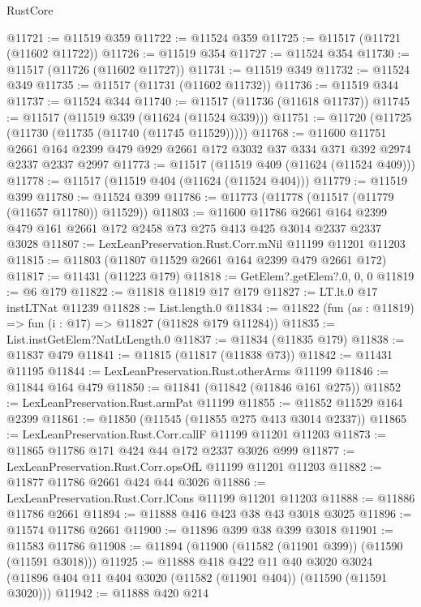 \begin{lexlean}{RustCore}
\begin{coremodule}
@11721 := @11519 @359
@11722 := @11524 @359
@11725 := @11517 (@11721 (@11602 @11722))
@11726 := @11519 @354
@11727 := @11524 @354
@11730 := @11517 (@11726 (@11602 @11727))
@11731 := @11519 @349
@11732 := @11524 @349
@11735 := @11517 (@11731 (@11602 @11732))
@11736 := @11519 @344
@11737 := @11524 @344
@11740 := @11517 (@11736 (@11618 @11737))
@11745 := @11517 (@11519 @339 (@11624 (@11524 @339)))
@11751 := @11720 (@11725 (@11730 (@11735 (@11740 (@11745 @11529)))))
@11768 := @11600
    @11751
    @2661
    @164
    @2399
    @479
    @929
    @2661
    @172
    @3032
    @37
    @334
    @371
    @392
    @2974
    @2337
    @2337
    @2997
@11773 := @11517 (@11519 @409 (@11624 (@11524 @409)))
@11778 := @11517 (@11519 @404 (@11624 (@11524 @404)))
@11779 := @11519 @399
@11780 := @11524 @399
@11786 := @11773 (@11778 (@11517 (@11779 (@11657 @11780)) @11529))
@11803 := @11600
    @11786
    @2661
    @164
    @2399
    @479
    @161
    @2661
    @172
    @2458
    @73
    @275
    @413
    @425
    @3014
    @2337
    @2337
    @3028
@11807 := LexLeanPreservation.Rust.Corr.mNil @11199 @11201 @11203
@11815 := @11803 (@11807 @11529 @2661 @164 @2399 @479 @2661 @172)
@11817 := @11431 (@11223 @179)
@11818 := GetElem?.getElem?.{0, 0, 0}
@11819 := @6 @179
@11822 := @11818 @11819 @17 @179
@11827 := LT.lt.{0} @17 instLTNat @11239
@11828 := List.length.{0}
@11834 := @11822 (fun (as : @11819) => fun (i : @17) => @11827 (@11828 @179 @11284))
@11835 := List.instGetElem?NatLtLength.{0}
@11837 := @11834 (@11835 @179)
@11838 := @11837 @479
@11841 := @11815 (@11817 (@11838 @73))
@11842 := @11431 @11195
@11844 := LexLeanPreservation.Rust.otherArms @11199
@11846 := @11844 @164 @479
@11850 := @11841 (@11842 (@11846 @161 @275))
@11852 := LexLeanPreservation.Rust.armPat @11199
@11855 := @11852 @11529 @164 @2399
@11861 := @11850 (@11545 (@11855 @275 @413 @3014 @2337))
@11865 := LexLeanPreservation.Rust.Corr.callF @11199 @11201 @11203
@11873 := @11865 @11786 @171 @424 @44 @172 @2337 @3026 @999
@11877 := LexLeanPreservation.Rust.Corr.opsOfL @11199 @11201 @11203
@11882 := @11877 @11786 @2661 @424 @44 @3026
@11886 := LexLeanPreservation.Rust.Corr.lCons @11199 @11201 @11203
@11888 := @11886 @11786 @2661
@11894 := @11888 @416 @423 @38 @43 @3018 @3025
@11896 := @11574 @11786 @2661
@11900 := @11896 @399 @38 @399 @3018
@11901 := @11583 @11786
@11908 := @11894 (@11900 (@11582 (@11901 @399)) (@11590 (@11591 @3018)))
@11925 := @11888
    @418
    @422
    @11
    @40
    @3020
    @3024
    (@11896 @404 @11 @404 @3020 (@11582 (@11901 @404)) (@11590 (@11591 @3020)))
@11942 := @11888
    @420
    @214

\end{coremodule}
\end{lexlean}
